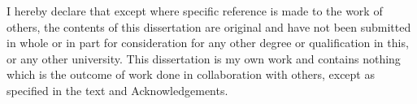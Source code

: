 
\begin{declaration}

I hereby declare that except where specific reference is made to the work of
others, the contents of this dissertation are original and have not been
submitted in whole or in part for consideration for any other degree or
qualification in this, or any other university. This dissertation is my own
work and contains nothing which is the outcome of work done in collaboration
with others, except as specified in the text and Acknowledgements.

\end{declaration}
